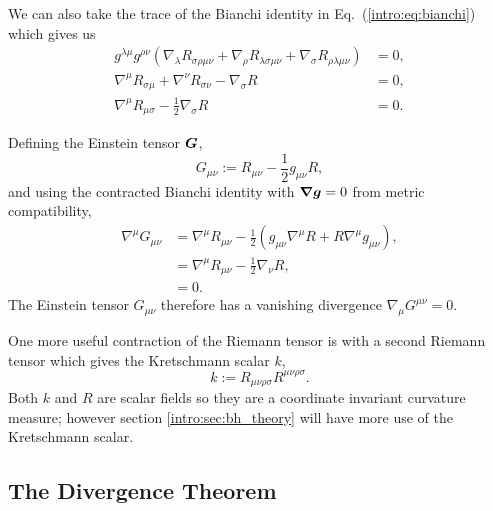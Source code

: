 We can also take the trace of the Bianchi identity in Eq.~(\ref{intro:eq:bianchi}) which gives us 
\begin{align}
g^{\lambda\mu}g^{\rho\nu} (\nabla_\lambda R_{\sigma\rho\mu\nu} + \nabla_\rho R_{\lambda\sigma\mu\nu} + \nabla_\sigma R_{\rho\lambda\mu\nu}) &= 0 , \\
 \nabla^\mu R_{\sigma\mu} + \nabla^\nu R_{\sigma\nu} - \nabla_\sigma R &= 0 , \\
 \nabla^\mu R_{\mu\sigma} - \frac{1}{2}\nabla_\sigma R&=0.
\end{align}

Defining the Einstein tensor $\boldsymbol{G}$,
\begin{equation}
G_{\mu\nu} := R_{\mu\nu} - \frac{1}{2}g_{\mu\nu}R, 
\end{equation}
and using the contracted Bianchi identity with $\boldsymbol{\nabla}\boldsymbol{g}=0$ from metric compatibility,
\begin{align}
\nabla^\mu G_{\mu\nu} &= \nabla^\mu R_{\mu\nu} - \frac{1}{2}\left(g_{\mu\nu}\nabla^\mu R + R\nabla^\mu g_{\mu\nu}\right) ,\\
&= \nabla^\mu R_{\mu\nu} - \frac{1}{2}\nabla_\nu R  ,\label{intro:eq:einstein_tensor_div}\\
&=0.
\end{align}
The Einstein tensor $G_{\mu\nu}$ therefore has a vanishing divergence $\nabla_\mu G^{\mu\nu}=0$.

One more useful contraction of the Riemann tensor is with a second Riemann tensor which gives the Kretschmann scalar $k$,
\begin{equation} \label{intro:eq:Kretschdef}
k := R_{\mu\nu\rho\sigma}R^{\mu\nu\rho\sigma}.
\end{equation}
Both $k$ and $R$ are scalar fields so they are a coordinate invariant curvature measure; however section \ref{intro:sec:bh_theory} will have more use of the Kretschmann scalar.




\subsection{The Divergence Theorem}\label{intro:sec:div}

